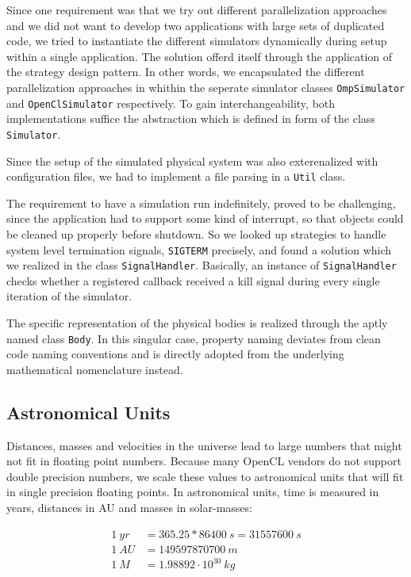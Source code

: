 \documentclass[a4paper,11pt]{scrartcl} %
\begin{document}
Since one requirement was that we try out different parallelization approaches and we did not want to develop two applications with large sets of duplicated code, we tried to instantiate the different simulators dynamically during setup within a single application. The solution offerd itself through the application of the strategy design pattern. In other words, we encapsulated the different parallelization approaches in whithin the seperate simulator classes \texttt{OmpSimulator} and \texttt{OpenClSimulator} respectively. To gain interchangeability, both implementations suffice the abstraction which is defined in form of the class \texttt{Simulator}.

Since the setup of the simulated physical system was also exterenalized with configuration files, we had to implement a file parsing in a \texttt{Util} class.

The requirement to have a simulation run indefinitely, proved to be challenging, since the application had to support some kind of interrupt, so that objects could be cleaned up properly before shutdown. So we looked up strategies to handle system level termination signals, \texttt{SIGTERM} precisely, and found a solution which we realized in the class \texttt{SignalHandler}. Basically, an instance of \texttt{SignalHandler} checks whether a registered callback received a kill signal during every single iteration of the simulator.

The specific representation of the physical bodies is realized through the aptly named class \texttt{Body}. In this singular case, property naming deviates from clean code naming conventions and is directly adopted from the underlying mathematical nomenclature instead.

\subsection{Astronomical Units}
Distances, masses and velocities in the universe lead to large numbers that might not fit in floating
point numbers. Because many OpenCL vendors do not support double precision numbers, we scale these values to astronomical units that will fit in single precision floating points. In astronomical units, time is
measured in years, distances in AU and masses in solar-masses:

\begin{align*}
	1~yr &= 365.25 * 86400~s = 31557600~s \\
	1~AU &= 149597870700~m \\
	1~M &=  1.98892 \cdot 10^{30}~kg
\end{align*}
\end{document}
